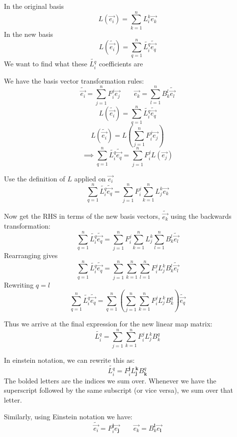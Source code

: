 \documentclass{report}
\begin{document}
In the original basis
$$ L\left( \vec{e_i} \right) = \sum_{k=1}^{n} L_i^k \vec{e_k} $$ 
In the new basis
$$ L\left(\widetilde{ \vec{e_i} }\right) = \sum_{q=1}^{n} \widetilde{L_i^q} \widetilde{\vec{e_q}} $$ 
We want to find what these $\widetilde{L_i^q}$ coefficients are


\begin{myproof}
	We have the basis vector transformation rules:
	$$ \widetilde{\vec{e_i}} = \sum_{j=1}^{n} F_i^j \vec{e_j} \qquad \vec{e_k} = \sum_{l=1}^{n} B_k^l \widetilde{\vec{e_l}} $$ 
$$ L\left(\widetilde{ \vec{e_i} }\right) = \sum_{q=1}^{n} \widetilde{L_i^q} \widetilde{\vec{e_q}}  $$ 
$$ L\left(\widetilde{\vec{e_i}}\right) = L\left(\sum_{j=1}^{n} F_i^j \vec{e_j}\right) $$ 
$$\implies  \sum_{q=1}^{n} \widetilde{L_i^q} \widetilde{\vec{e_q}} = \sum_{j=1}^{n} F_i^j L\left(\vec{e_j}\right) $$ 

Use the definition of $L$ applied on $\vec{e_i}$ 
$$ \sum_{q=1}^{n} \widetilde{L_i^q} \widetilde{\vec{e_q}} = \sum_{j=1}^{n} F_i^j \sum_{k=1}^{n} L_j^k \vec{e_k} $$ 

Now get the RHS in terms of the new basis vectors, $\widetilde{\vec{e_k}}$ using the backwards transformation:
$$ \sum_{q=1}^{n} \widetilde{L_i^q} \widetilde{\vec{e_q}} = \sum_{j=1}^{n} F_i^j \sum_{k=1}^{n} L_j^k \sum_{l=1}^{n} B_k^l \widetilde{\vec{e_l}} $$ 
Rearranging gives
$$ \sum_{q=1}^{n} \widetilde{L_i^q} \widetilde{\vec{e_q}} = \sum_{j=1}^{n}  \sum_{k=1}^{n}  \sum_{l=1}^{n}  F_i^j L_j^k B_k^l \widetilde{\vec{e_l}} $$ 
Rewriting $q = l$
$$ \sum_{q=1}^{n} \widetilde{L_i^q} \widetilde{\vec{e_q}} = \sum_{q=1}^{n} \left(\sum_{j=1}^{n}  \sum_{k=1}^{n}    F_i^j L_j^k B_k^q\right) \widetilde{\vec{e_q}} $$ 

Thus we arrive at the final expression for the new linear map matrix:
$$ \widetilde{L_i^q} = \sum_{j=1}^{n} \sum_{k=1}^{n} F_i^j L_j^k B_k^q  $$ 


\end{myproof}

In einstein notation, we can rewrite this as:
$$ \widetilde{L_i^q} = F_i^{\pmb{j}} L_{\pmb{j}}^{\pmb{k}} B_{\pmb{k}}^q $$ 
The bolded letters are the indices we sum over. Whenever we have the superscript followed by the same subscript (or vice versa), we sum over that letter.

Similarly, using Einstein notation we have:
$$ \widetilde{\vec{e_i} }= F_i^{\pmb{j}} \vec{e_{\pmb{j}}} \qquad \vec{e_k} = B_k^{\pmb{l}} \vec{e_{\pmb{l}}} $$ 
\end{document}
